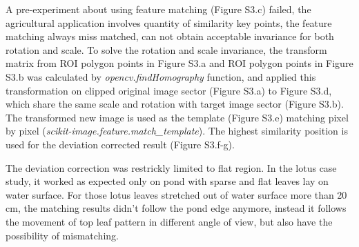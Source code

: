 \documentclass{configs/bmcart}
\begin{document}
\begin{backmatter}
A pre-experiment about using feature matching (Figure S3.c) failed, the agricultural application involves quantity of similarity key points, the feature matching always miss matched, can not obtain acceptable invariance for both rotation and scale. To solve the rotation and scale invariance, the transform matrix from ROI polygon points in Figure S3.a and ROI polygon points in Figure S3.b was calculated by \textit{opencv.findHomography} function, and applied this transformation on clipped original image sector (Figure S3.a) to Figure S3.d, which share the same scale and rotation with target image sector (Figure S3.b). The transformed new image is used as the template (Figure S3.e) matching pixel by pixel (\textit{scikit-image.feature.match\_template}). The highest similarity position is used for the deviation corrected result (Figure S3.f-g).

The deviation correction was restrickly limited to flat region. In the lotus case study, it worked as expected only on pond with sparse and flat leaves lay on water surface. For those lotus leaves stretched out of water surface more than 20 cm, the matching results didn't follow the pond edge anymore, instead it follows the movement of top leaf pattern in different angle of view, but also have the possibility of mismatching.




\end{backmatter}
\end{document}
